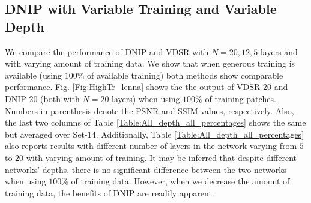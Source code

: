 \documentclass[9pt]{article}
\begin{document}
\subsection{DNIP with Variable Training and Variable Depth }
We compare the performance of DNIP and VDSR with $N=20, 12, 5$ layers and with varying amount of training data. We show that when generous training is available (using $100\%$ of available training) both methods show comparable performance. Fig. \ref{Fig:HighTr_lenna} shows the the output of VDSR-20 and DNIP-20 (both with $N=20$ layers) when using $100\%$ of training patches. Numbers in parenthesis denote the PSNR and SSIM values, respectively. Also, the last two columns of Table \ref{Table:All_depth_all_percentages} shows the same but averaged over Set-14. Additionally, Table \ref{Table:All_depth_all_percentages} also reports results with different number of layers in the network varying from $5$ to $20$ with varying amount of training.  It may be inferred that despite different networks' depths, there is no significant difference between the two networks when using $100\%$ of training data. However, when we decrease the amount of training data, the benefits of DNIP are readily apparent.
\end{document}
